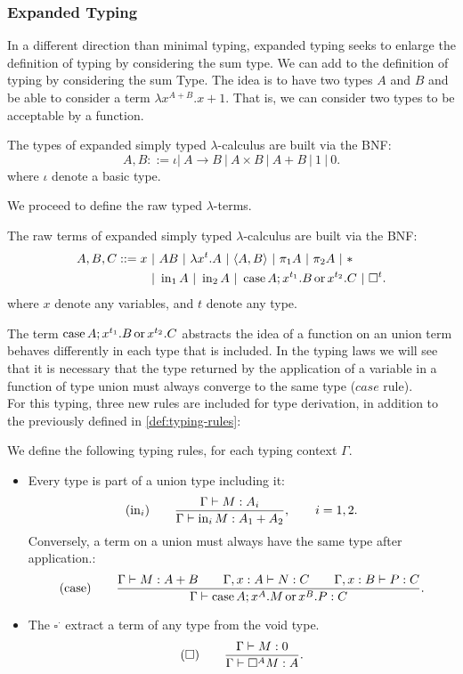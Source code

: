 \subsubsection{Expanded Typing}
In a different direction than minimal typing, expanded typing seeks to enlarge the definition of typing by considering the sum type. We can add to the definition of typing by considering the sum Type. The idea is to have two types $A$ and $B$ and be able to consider a term $\lambda x^{A+B}. x+1$. That is, we can consider two types to be acceptable by a function. 

\begin{definition}
  The types of expanded simply typed $\lambda$-calculus are built via the BNF:
  $$A,B ::= \iota |\ A\to B\ |\ A \times B \ |\ A + B  \ |\ 1\ |\ 0.$$
  where $\iota$ denote a basic type. 
\end{definition}

We proceed to define the raw typed $\lambda$-terms.

\begin{definition}
  The raw terms of expanded simply typed $\lambda$-calculus are built via the BNF:
  \begin{align*}
    A,B, C ::= x\ &|\ AB\ |\ \lambda x^t.A \ |\ \langle A,B \rangle\ |\ \pi_1A\ |\ \pi_2A\ |\ * \\
                  &|\ \iin_1 A\ |\ \iin_2 A \ |\ \ccase A ; x^{t_1}.B\oo x^{t_2}.C \ |\ \square^t. 
  \end{align*}
  where $x$ denote any variables, and $t$ denote any type. 
\end{definition}

The term $\operatorname{case} A ; x^{t_1}.B\operatorname{ or } x^{t_2}.C$ abstracts the idea of a function on  an union term behaves differently in each type that is included. In the typing laws we will see that it is necessary that the type returned by the application of a variable in a function of type union must always converge to the same type ($case$ rule).\\

For this typing, three new rules are included for type derivation, in addition to the previously defined in \ref{def:typing-rules}:
\begin{definition}
  We define the following typing rules, for each typing context $\Gamma$.
  \begin{itemize}
  \item Every type is part of a union type including it:
    $$  (\operatorname{in}_i)\qquad  {\displaystyle\Gamma \vdash M:A_i \over \Gamma \vdash \operatorname{in}_i M:A_1+A_2},\qquad  i=  1,2.$$
    Conversely, a term on a union must always have the same type after application.:
    $$(\operatorname{case}) \qquad {\displaystyle \Gamma\vdash M: A+B\qquad \Gamma, x:A\vdash N: C\qquad \Gamma, x:B\vdash P: C \over \Gamma \vdash \operatorname{case}A ; x^{A}.M\operatorname{ or }x^{B}.P:C}.$$
  \item The $\square^\cdot$ extract a term of any type from the void type.
    $$  (\square)\qquad  {\displaystyle\Gamma \vdash M:0 \over \Gamma \vdash \square^A M:A}.$$
  \end{itemize}
\end{definition}

